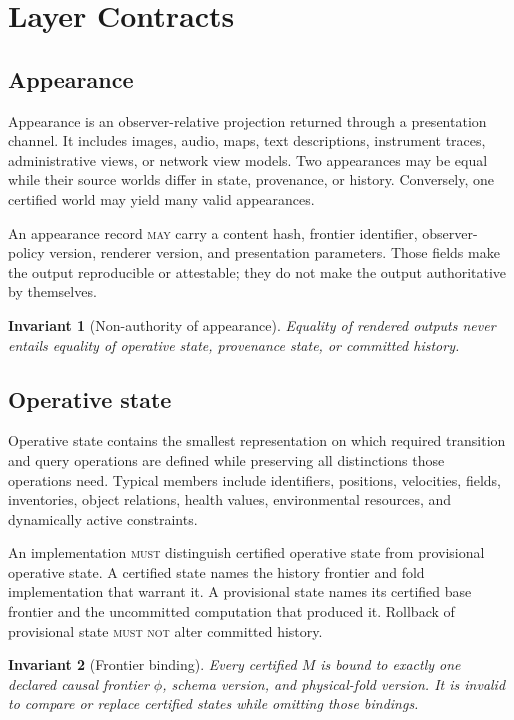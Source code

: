 \documentclass[11pt]{article}
\newtheorem{invariant}{Invariant}
\newcommand{\MUST}{\textsc{must}}
\newcommand{\MUSTNOT}{\textsc{must not}}
\newcommand{\MAY}{\textsc{may}}
\begin{document}
\section{Layer Contracts}

\subsection{Appearance}
\label{sec:appearance-section}

Appearance is an observer-relative projection returned through a presentation channel. It includes images, audio, maps, text descriptions, instrument traces, administrative views, or network view models. Two appearances may be equal while their source worlds differ in state, provenance, or history. Conversely, one certified world may yield many valid appearances.

An appearance record \MAY{} carry a content hash, frontier identifier, observer-policy version, renderer version, and presentation parameters. Those fields make the output reproducible or attestable; they do not make the output authoritative by themselves.

\begin{invariant}[Non-authority of appearance]
Equality of rendered outputs never entails equality of operative state, provenance state, or committed history.
\end{invariant}

\subsection{Operative state}

Operative state contains the smallest representation on which required transition and query operations are defined while preserving all distinctions those operations need. Typical members include identifiers, positions, velocities, fields, inventories, object relations, health values, environmental resources, and dynamically active constraints.

An implementation \MUST{} distinguish certified operative state from provisional operative state. A certified state names the history frontier and fold implementation that warrant it. A provisional state names its certified base frontier and the uncommitted computation that produced it. Rollback of provisional state \MUSTNOT{} alter committed history.

\begin{invariant}[Frontier binding]
Every certified $M$ is bound to exactly one declared causal frontier $\phi$, schema version, and physical-fold version. It is invalid to compare or replace certified states while omitting those bindings.
\end{invariant}
\end{document}
